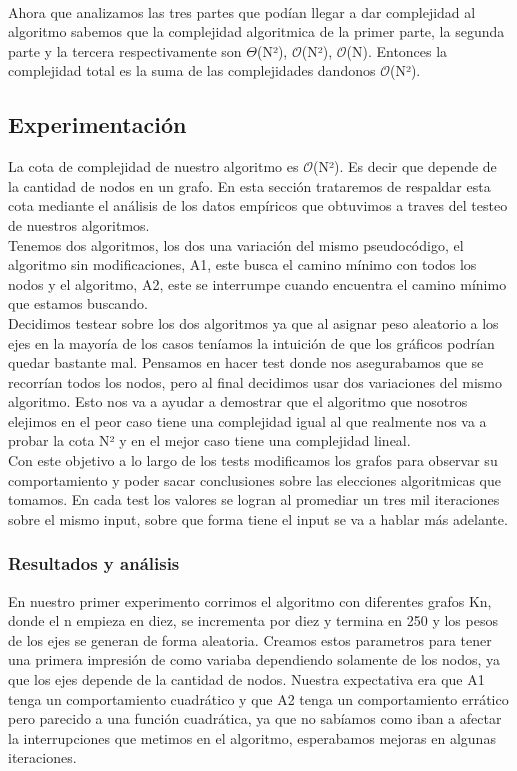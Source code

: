 \documentclass[spanish,12pt]{article}
\begin{document}
\\
\tab Ahora que analizamos las tres partes que podían llegar a dar complejidad al algoritmo sabemos que la complejidad algoritmica de la primer parte, la segunda parte y la tercera respectivamente son $\Theta$(N²), $\mathcal{O}$(N²), $\mathcal{O}$(N). Entonces la complejidad total es la suma de las complejidades dandonos $\mathcal{O}$(N²).

\subsection{Experimentación}

La cota de complejidad de nuestro algoritmo es $\mathcal{O}$(N²). Es decir que depende de la cantidad de nodos en un grafo.
En esta sección trataremos de respaldar esta cota mediante el análisis de los datos empíricos que obtuvimos a traves del testeo de nuestros algoritmos.
\\
Tenemos dos algoritmos, los dos una variación del mismo pseudocódigo, el algoritmo sin modificaciones, A1, este busca el camino mínimo con todos los nodos y el algoritmo, A2, este se interrumpe cuando encuentra el camino mínimo que estamos buscando.  
\\
 Decidimos testear sobre los dos algoritmos ya que al asignar peso aleatorio a los ejes en la mayoría de los casos teníamos la intuición de que los gráficos podrían quedar bastante mal. Pensamos en hacer test donde nos asegurabamos que se recorrían todos los nodos, pero al final decidimos usar dos variaciones del mismo algoritmo. Esto nos va a ayudar a demostrar que el algoritmo que nosotros elejimos en el peor caso tiene una complejidad igual al que realmente nos va a probar la cota N² y en el mejor caso tiene una complejidad lineal.
\\  
Con este objetivo a lo largo de los tests modificamos los grafos para observar su comportamiento y poder sacar conclusiones sobre las elecciones algoritmicas que tomamos. En cada test los valores se logran al promediar un tres mil iteraciones sobre el mismo input, sobre que forma tiene el input se va a hablar más adelante.

\subsubsection{Resultados y análisis}

En nuestro primer experimento corrimos el algoritmo con diferentes grafos Kn, donde el n empieza en diez, se incrementa por diez y termina en 250 y los pesos de los ejes se generan de forma aleatoria. Creamos estos parametros para tener una primera impresión de como variaba dependiendo solamente de los nodos, ya que los ejes depende de la cantidad de nodos. Nuestra expectativa era que A1 tenga un comportamiento cuadrático y que A2 tenga un comportamiento errático pero parecido a una función cuadrática, ya que no sabíamos como iban a afectar la interrupciones que metimos en el algoritmo, esperabamos mejoras en algunas iteraciones.
\end{document}

